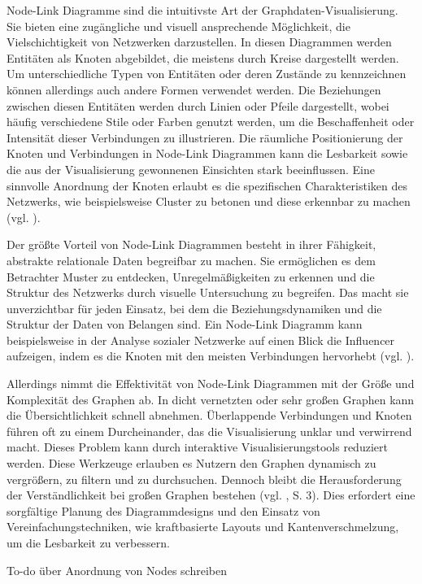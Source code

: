 Node-Link Diagramme sind die intuitivste Art der Graphdaten-Visualisierung. Sie bieten eine zugängliche und visuell  ansprechende Möglichkeit, die Vielschichtigkeit von Netzwerken darzustellen. In diesen Diagrammen werden Entitäten als Knoten abgebildet, die meistens durch Kreise dargestellt werden. Um unterschiedliche Typen von Entitäten oder deren Zustände zu kennzeichnen können allerdings auch andere Formen verwendet werden. Die Beziehungen zwischen diesen Entitäten werden durch Linien oder Pfeile dargestellt, wobei häufig verschiedene Stile oder Farben genutzt werden, um die Beschaffenheit oder Intensität dieser Verbindungen zu illustrieren. Die räumliche Positionierung der Knoten und Verbindungen in Node-Link Diagrammen kann die Lesbarkeit sowie die aus der Visualisierung gewonnenen Einsichten stark beeinflussen. Eine sinnvolle Anordnung der Knoten erlaubt es die spezifischen Charakteristiken des Netzwerks, wie beispielsweise Cluster zu betonen und diese erkennbar zu machen (vgl. \cite{nodelink:Basics}).

Der größte Vorteil von Node-Link Diagrammen besteht in ihrer Fähigkeit, abstrakte relationale Daten begreifbar zu machen. Sie ermöglichen es dem Betrachter Muster zu entdecken, Unregelmäßigkeiten zu erkennen und die Struktur des Netzwerks durch visuelle Untersuchung zu begreifen. Das macht sie unverzichtbar für jeden Einsatz, bei dem die Beziehungsdynamiken und die Struktur der Daten von Belangen sind. Ein Node-Link Diagramm kann beispielsweise in der Analyse sozialer Netzwerke auf einen Blick die Influencer aufzeigen, indem es die Knoten mit den meisten Verbindungen hervorhebt (vgl. \cite{nodelink:Basics}).

Allerdings nimmt die Effektivität von Node-Link Diagrammen mit der Größe und Komplexität des Graphen ab. In dicht vernetzten oder sehr großen Graphen kann die Übersichtlichkeit schnell abnehmen. Überlappende Verbindungen und Knoten führen oft zu einem Durcheinander, das die Visualisierung unklar und verwirrend macht. Dieses Problem kann durch interaktive Visualisierungstools reduziert werden. Diese Werkzeuge erlauben es Nutzern den Graphen dynamisch zu vergrößern, zu filtern und zu durchsuchen. Dennoch bleibt die Herausforderung der Verständlichkeit bei großen Graphen bestehen (vgl. \cite{nodelink:DynamicGraph}, S. 3). Dies erfordert eine sorgfältige Planung des Diagrammdesigns und den Einsatz von Vereinfachungstechniken, wie kraftbasierte Layouts und Kantenverschmelzung, um die Lesbarkeit zu verbessern.

To-do über Anordnung von Nodes schreiben


